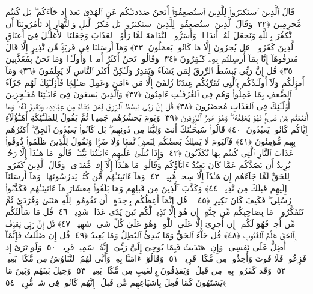  قَالَ ٱلَّذِينَ ٱستَكبَرُوا۟ لِلَّذِينَ ٱستُضعِفُوٓا۟ أَنَحنُ صَدَدنَـٰكُم عَنِ ٱلهُدَىٰ بَعدَ إِذ جَآءَكُم ۖ بَل كُنتُم مُّجرِمِينَ ﴿٣٢﴾
 وَقَالَ ٱلَّذِينَ ٱستُضعِفُوا۟ لِلَّذِينَ ٱستَكبَرُوا۟ بَل مَكرُ ٱلَّيلِ وَٱلنَّهَارِ إِذ تَأمُرُونَنَآ أَن نَّكفُرَ بِٱللَّهِ وَنَجعَلَ لَهُۥٓ أَندَادًۭا ۚ وَأَسَرُّوا۟ ٱلنَّدَامَةَ لَمَّا رَأَوُا۟ ٱلعَذَابَ وَجَعَلنَا ٱلأَغلَـٰلَ فِىٓ أَعنَاقِ ٱلَّذِينَ كَفَرُوا۟ ۚ هَل يُجزَونَ إِلَّا مَا كَانُوا۟ يَعمَلُونَ ﴿٣٣﴾
 وَمَآ أَرسَلنَا فِى قَريَةٍۢ مِّن نَّذِيرٍ إِلَّا قَالَ مُترَفُوهَآ إِنَّا بِمَآ أُرسِلتُم بِهِۦ كَـٰفِرُونَ ﴿٣٤﴾
 وَقَالُوا۟ نَحنُ أَكثَرُ أَموَٟلًۭا وَأَولَـٰدًۭا وَمَا نَحنُ بِمُعَذَّبِينَ ﴿٣٥﴾
 قُل إِنَّ رَبِّى يَبسُطُ ٱلرِّزقَ لِمَن يَشَآءُ وَيَقدِرُ وَلَـٰكِنَّ أَكثَرَ ٱلنَّاسِ لَا يَعلَمُونَ ﴿٣٦﴾
 وَمَآ أَموَٟلُكُم وَلَآ أَولَـٰدُكُم بِٱلَّتِى تُقَرِّبُكُم عِندَنَا زُلفَىٰٓ إِلَّا مَن ءَامَنَ وَعَمِلَ صَـٰلِحًۭا فَأُو۟لَـٰٓئِكَ لَهُم جَزَآءُ ٱلضِّعفِ بِمَا عَمِلُوا۟ وَهُم فِى ٱلغُرُفَـٰتِ ءَامِنُونَ ﴿٣٧﴾
 وَٱلَّذِينَ يَسعَونَ فِىٓ ءَايَـٰتِنَا مُعَـٰجِزِينَ أُو۟لَـٰٓئِكَ فِى ٱلعَذَابِ مُحضَرُونَ ﴿٣٨﴾
 قُل إِنَّ رَبِّى يَبسُطُ ٱلرِّزقَ لِمَن يَشَآءُ مِن عِبَادِهِۦ وَيَقدِرُ لَهُۥ ۚ وَمَآ أَنفَقتُم مِّن شَىءٍۢ فَهُوَ يُخلِفُهُۥ ۖ وَهُوَ خَيرُ ٱلرَّٟزِقِينَ ﴿٣٩﴾
 وَيَومَ يَحشُرُهُم جَمِيعًۭا ثُمَّ يَقُولُ لِلمَلَـٰٓئِكَةِ أَهَـٰٓؤُلَآءِ إِيَّاكُم كَانُوا۟ يَعبُدُونَ ﴿٤٠﴾
 قَالُوا۟ سُبحَـٰنَكَ أَنتَ وَلِيُّنَا مِن دُونِهِم ۖ بَل كَانُوا۟ يَعبُدُونَ ٱلجِنَّ ۖ أَكثَرُهُم بِهِم مُّؤمِنُونَ ﴿٤١﴾
 فَٱليَومَ لَا يَملِكُ بَعضُكُم لِبَعضٍۢ نَّفعًۭا وَلَا ضَرًّۭا وَنَقُولُ لِلَّذِينَ ظَلَمُوا۟ ذُوقُوا۟ عَذَابَ ٱلنَّارِ ٱلَّتِى كُنتُم بِهَا تُكَذِّبُونَ ﴿٤٢﴾
 وَإِذَا تُتلَىٰ عَلَيهِم ءَايَـٰتُنَا بَيِّنَـٰتٍۢ قَالُوا۟ مَا هَـٰذَآ إِلَّا رَجُلٌۭ يُرِيدُ أَن يَصُدَّكُم عَمَّا كَانَ يَعبُدُ ءَابَآؤُكُم وَقَالُوا۟ مَا هَـٰذَآ إِلَّآ إِفكٌۭ مُّفتَرًۭى ۚ وَقَالَ ٱلَّذِينَ كَفَرُوا۟ لِلحَقِّ لَمَّا جَآءَهُم إِن هَـٰذَآ إِلَّا سِحرٌۭ مُّبِينٌۭ ﴿٤٣﴾
 وَمَآ ءَاتَينَـٰهُم مِّن كُتُبٍۢ يَدرُسُونَهَا ۖ وَمَآ أَرسَلنَآ إِلَيهِم قَبلَكَ مِن نَّذِيرٍۢ ﴿٤٤﴾
 وَكَذَّبَ ٱلَّذِينَ مِن قَبلِهِم وَمَا بَلَغُوا۟ مِعشَارَ مَآ ءَاتَينَـٰهُم فَكَذَّبُوا۟ رُسُلِى ۖ فَكَيفَ كَانَ نَكِيرِ ﴿٤٥﴾
 ۞ قُل إِنَّمَآ أَعِظُكُم بِوَٟحِدَةٍ ۖ أَن تَقُومُوا۟ لِلَّهِ مَثنَىٰ وَفُرَٰدَىٰ ثُمَّ تَتَفَكَّرُوا۟ ۚ مَا بِصَاحِبِكُم مِّن جِنَّةٍ ۚ إِن هُوَ إِلَّا نَذِيرٌۭ لَّكُم بَينَ يَدَى عَذَابٍۢ شَدِيدٍۢ ﴿٤٦﴾
 قُل مَا سَأَلتُكُم مِّن أَجرٍۢ فَهُوَ لَكُم ۖ إِن أَجرِىَ إِلَّا عَلَى ٱللَّهِ ۖ وَهُوَ عَلَىٰ كُلِّ شَىءٍۢ شَهِيدٌۭ ﴿٤٧﴾
 قُل إِنَّ رَبِّى يَقذِفُ بِٱلحَقِّ عَلَّٰمُ ٱلغُيُوبِ ﴿٤٨﴾
 قُل جَآءَ ٱلحَقُّ وَمَا يُبدِئُ ٱلبَٰطِلُ وَمَا يُعِيدُ ﴿٤٩﴾
 قُل إِن ضَلَلتُ فَإِنَّمَآ أَضِلُّ عَلَىٰ نَفسِى ۖ وَإِنِ ٱهتَدَيتُ فَبِمَا يُوحِىٓ إِلَىَّ رَبِّىٓ ۚ إِنَّهُۥ سَمِيعٌۭ قَرِيبٌۭ ﴿٥٠﴾
 وَلَو تَرَىٰٓ إِذ فَزِعُوا۟ فَلَا فَوتَ وَأُخِذُوا۟ مِن مَّكَانٍۢ قَرِيبٍۢ ﴿٥١﴾
 وَقَالُوٓا۟ ءَامَنَّا بِهِۦ وَأَنَّىٰ لَهُمُ ٱلتَّنَاوُشُ مِن مَّكَانٍۭ بَعِيدٍۢ ﴿٥٢﴾
 وَقَد كَفَرُوا۟ بِهِۦ مِن قَبلُ ۖ وَيَقذِفُونَ بِٱلغَيبِ مِن مَّكَانٍۭ بَعِيدٍۢ ﴿٥٣﴾
 وَحِيلَ بَينَهُم وَبَينَ مَا يَشتَهُونَ كَمَا فُعِلَ بِأَشيَاعِهِم مِّن قَبلُ ۚ إِنَّهُم كَانُوا۟ فِى شَكٍّۢ مُّرِيبٍۭ ﴿٥٤﴾
 
